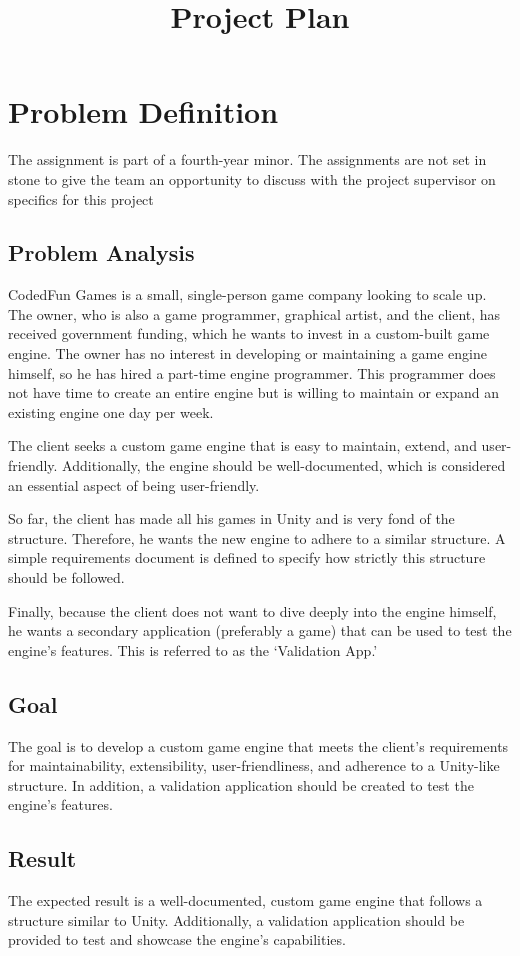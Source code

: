 \documentclass{projdoc}
\title{Project Plan}
\begin{document}
\tablestables
\newpage

\section{Problem Definition}
The assignment is part of a fourth-year minor. The assignments are not set in stone to give the team an opportunity to discuss with the project supervisor on specifics for this project 

\subsection{Problem Analysis}
CodedFun Games is a small, single-person game company looking to scale up. The owner, who is also a game programmer, graphical artist, and the client, has received government funding, which he wants to invest in a custom-built game engine. The owner has no interest in developing or maintaining a game engine himself, so he has hired a part-time engine programmer. This programmer does not have time to create an entire engine but is willing to maintain or expand an existing engine one day per week.

The client seeks a custom game engine that is easy to maintain, extend, and user-friendly. Additionally, the engine should be well-documented, which is considered an essential aspect of being user-friendly.

So far, the client has made all his games in Unity and is very fond of the structure. Therefore, he wants the new engine to adhere to a similar structure. A simple requirements document is defined to specify how strictly this structure should be followed.

Finally, because the client does not want to dive deeply into the engine himself, he wants a secondary application (preferably a game) that can be used to test the engine's features. This is referred to as the `Validation App.'

\subsection{Goal}
The goal is to develop a custom game engine that meets the client's requirements for maintainability, extensibility, user-friendliness, and adherence to a Unity-like structure. In addition, a validation application should be created to test the engine's features.

\subsection{Result}
The expected result is a well-documented, custom game engine that follows a structure similar to Unity. Additionally, a validation application should be provided to test and showcase the engine's capabilities.
\end{document}
